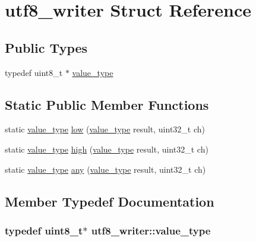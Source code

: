 \hypertarget{structutf8__writer}{\section{utf8\-\_\-writer Struct Reference}
\label{structutf8__writer}
}
\subsection*{Public Types}
\begin{DoxyCompactItemize}
\item 
typedef uint8\-\_\-t $\ast$ \hyperlink{structutf8__writer_af25ec3c651f9a4a3f193573a4e95002b}{value\-\_\-type}
\end{DoxyCompactItemize}
\subsection*{Static Public Member Functions}
\begin{DoxyCompactItemize}
\item 
static \hyperlink{structutf8__writer_af25ec3c651f9a4a3f193573a4e95002b}{value\-\_\-type} \hyperlink{structutf8__writer_ac4ec52da6f37225ba4fde259bff2f86c}{low} (\hyperlink{structutf8__writer_af25ec3c651f9a4a3f193573a4e95002b}{value\-\_\-type} result, uint32\-\_\-t ch)
\item 
static \hyperlink{structutf8__writer_af25ec3c651f9a4a3f193573a4e95002b}{value\-\_\-type} \hyperlink{structutf8__writer_ac03dfaf797d599afdf0be7def86ff9b9}{high} (\hyperlink{structutf8__writer_af25ec3c651f9a4a3f193573a4e95002b}{value\-\_\-type} result, uint32\-\_\-t ch)
\item 
static \hyperlink{structutf8__writer_af25ec3c651f9a4a3f193573a4e95002b}{value\-\_\-type} \hyperlink{structutf8__writer_a288e9c5f3720b95ae6b77330ad38dd56}{any} (\hyperlink{structutf8__writer_af25ec3c651f9a4a3f193573a4e95002b}{value\-\_\-type} result, uint32\-\_\-t ch)
\end{DoxyCompactItemize}


\subsection{Member Typedef Documentation}
\hypertarget{structutf8__writer_af25ec3c651f9a4a3f193573a4e95002b}{
\subsubsection[{value\-\_\-type}]{\setlength{\rightskip}{0pt plus 5cm}typedef uint8\-\_\-t$\ast$ {\bf utf8\-\_\-writer\-::value\-\_\-type}}}\label{structutf8__writer_af25ec3c651f9a4a3f193573a4e95002b}


